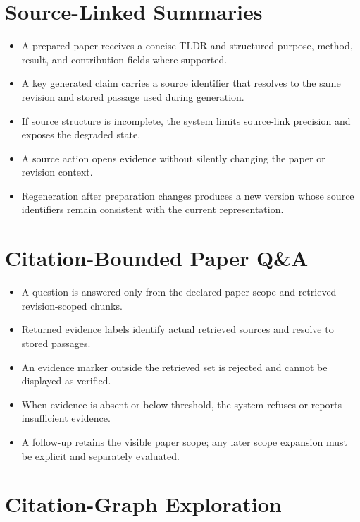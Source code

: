 \section{Source-Linked Summaries}

\begin{itemize}
  \item A prepared paper receives a concise TLDR and structured purpose, method, result, and contribution fields where supported.
  \item A key generated claim carries a source identifier that resolves to the same revision and stored passage used during generation.
  \item If source structure is incomplete, the system limits source-link precision and exposes the degraded state.
  \item A source action opens evidence without silently changing the paper or revision context.
  \item Regeneration after preparation changes produces a new version whose source identifiers remain consistent with the current representation.
\end{itemize}

\section{Citation-Bounded Paper Q\&A}

\begin{itemize}
  \item A question is answered only from the declared paper scope and retrieved revision-scoped chunks.
  \item Returned evidence labels identify actual retrieved sources and resolve to stored passages.
  \item An evidence marker outside the retrieved set is rejected and cannot be displayed as verified.
  \item When evidence is absent or below threshold, the system refuses or reports insufficient evidence.
  \item A follow-up retains the visible paper scope; any later scope expansion must be explicit and separately evaluated.
\end{itemize}

\section{Citation-Graph Exploration}

